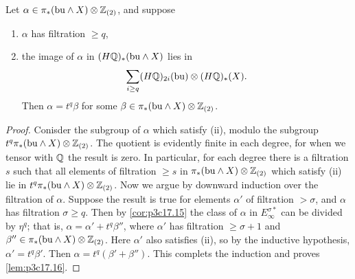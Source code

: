 \documentclass[../main]{subfiles}
\begin{document}
\begin{lemma}
\label{lem:p3c17.16}
Let $\alpha \in \pi_\ast(\mathrm{bu} \wedge X) \otimes \mathbb{Z}_{(2)}$, and suppose 

\begin{enumerate}
    \item[(i)] $\alpha$ has filtration $\ge q$, 
    \item[(ii)] the image of $\alpha$ in $(H \mathbb{Q})_\ast(\mathrm{bu} \wedge X)$ lies in \[\sum_{i \ge q} (H \mathbb{Q})_{2i}(\mathrm{bu}) \otimes (H \mathbb{Q})_\ast(X).\] Then $\alpha = t^q \beta$ for some $\beta \in \pi_\ast(\mathrm{bu} \wedge X) \otimes \mathbb{Z}_{(2)}$.
\end{enumerate}
\end{lemma}

\begin{proof}
Conisder the subgroup of $\alpha$ which satisfy (ii), modulo the subgroup\newline $t^q \pi_\ast(\mathrm{bu} \wedge X) \otimes \mathbb{Z}_{(2)}$. The quotient is evidently finite in each degree, for when we tensor with $\mathbb{Q}$ the result is zero. In particular, for each degree there is a filtration $s$ such that all elements of filtration $\ge s$ in $\pi_\ast(\mathrm{bu} \wedge X) \otimes \mathbb{Z}_{(2)}$ which satisfy (ii) lie in $t^q \pi_\ast(\mathrm{bu} \wedge X) \otimes \mathbb{Z}_{(2)}$. Now we argue by downward induction over the filtration of $\alpha$. Suppose the result is true for elements $\alpha'$ of filtration $> \sigma$, and $\alpha$ has filtration $\sigma \ge q$. Then by \ref{cor:p3c17.15} the class of $\alpha$ in $E_\infty^{\sigma\ast}$ can be divided by $\eta^q$; that is, $\alpha = \alpha' + t^q \beta''$, where $\alpha'$ has filtration $\ge \sigma + 1$ and $\beta'' \in \pi_\ast(\mathrm{bu} \wedge X) \otimes \mathbb{Z}_{(2)}$. Here $\alpha'$ also satisfies (ii), so by the inductive hypothesis, $\alpha' = t^q \beta'$. Then $\alpha = t^q(\beta' + \beta'')$. This complets the induction and proves \ref{lem:p3c17.16}.
\end{proof}
\end{document}

